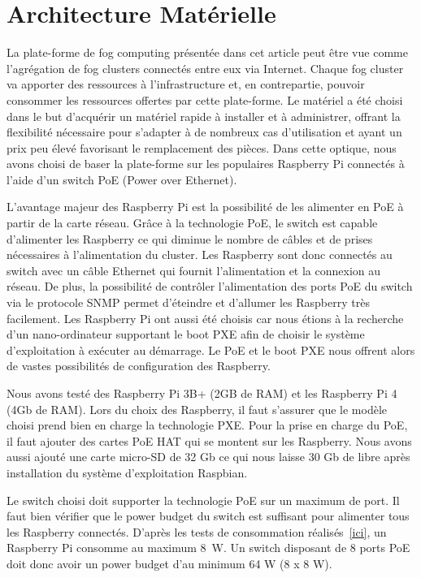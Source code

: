 \documentclass[letterpaper, 10 pt, conference]{ieeeconf}
\begin{document}
\section{Architecture Matérielle}
\label{sec:architecture}
La plate-forme de fog computing présentée dans cet article peut être vue comme l'agrégation de fog clusters connectés entre eux via Internet. Chaque fog cluster va apporter des ressources à l'infrastructure et, en contrepartie, pouvoir consommer les ressources offertes par cette plate-forme.
Le matériel a été choisi dans le but d'acquérir un matériel rapide à installer et à administrer, offrant la flexibilité nécessaire pour s'adapter à de nombreux cas d'utilisation et ayant un prix peu élevé favorisant le remplacement des pièces. Dans cette optique, nous avons choisi de baser la plate-forme sur les populaires Raspberry Pi connectés à l'aide d'un switch PoE (Power over Ethernet).

L'avantage majeur des Raspberry Pi est la possibilité de les alimenter en PoE à partir de la carte réseau. Grâce à la technologie PoE, le switch est capable d'alimenter les  Raspberry ce qui diminue le nombre de câbles et de prises nécessaires à l'alimentation du cluster. Les Raspberry sont donc connectés au switch avec un câble Ethernet qui fournit l'alimentation et la connexion au réseau. De plus, la possibilité de contrôler l'alimentation des ports PoE du switch via le protocole SNMP permet d'éteindre et d'allumer les Raspberry très facilement. Les Raspberry Pi ont aussi été choisis car nous étions à la recherche d'un nano-ordinateur supportant le boot PXE afin de choisir le système d'exploitation à exécuter au démarrage. Le PoE et le boot PXE nous offrent alors de vastes possibilités de configuration des Raspberry.

Nous avons testé des Raspberry Pi 3B+ (2GB de RAM) et les Raspberry Pi 4 (4Gb de RAM). Lors du choix des Raspberry, il faut s'assurer que le modèle choisi prend bien en charge la technologie PXE. Pour la prise en charge du PoE, il faut ajouter des cartes PoE HAT qui se montent sur les Raspberry. Nous avons aussi ajouté une carte micro-SD de 32 Gb ce qui nous laisse 30 Gb de libre après installation du système d'exploitation Raspbian.

Le switch choisi doit supporter la technologie PoE sur un maximum de port. Il faut bien vérifier que le power budget du switch est suffisant pour alimenter tous les Raspberry connectés. D'après les tests de consommation réalisés~\ref{ici}, un Raspberry Pi consomme au maximum 8~W. Un switch disposant de 8 ports PoE doit donc avoir un power budget d'au minimum 64 W (8 x 8 W).
\end{document}
